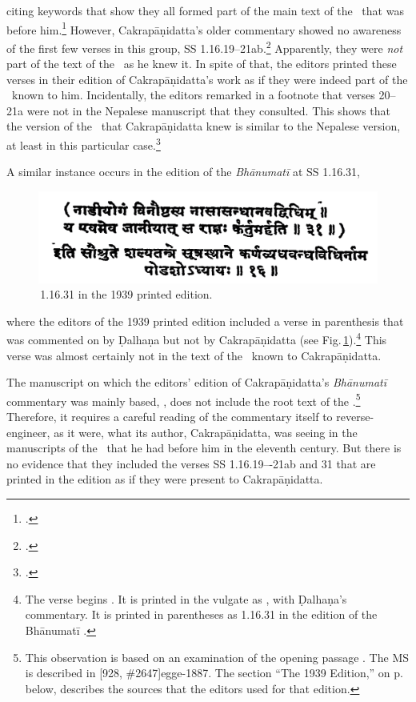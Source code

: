 citing keywords that show they all formed part of the main text of the \SS\ that
was before him.\footnote{.} However, Cakrapāṇidatta's
    older commentary showed no awareness of the first few verses in this group, SS
    1.16.19--21ab.\footcite[130--131]{acar-1939}  Apparently, they were \emph{not}
    part of the text of the \SS\ as he knew it.  In spite of that, the editors printed
    these verses in their edition of Cakrapāṇidatta's work as if they were indeed part
    of the \SS\ known to him. Incidentally, the editors remarked in a footnote that
    verses 20--21a were not in the Nepalese manuscript that they consulted.  This
    shows that the version of the \SS\ that Cakrapāṇidatta knew is similar to the
    Nepalese version, at least in this particular case.\footcite[130, n.\,2]{acar-1939}

A similar instance occurs in the edition of the \emph{Bhānumatī} at SS 1.16.31, 
\begin{figure}[t]
    \centering
    \includegraphics[draft=false,width=.90\linewidth]{media/nadiyogam-upscaled}
    \caption{\SS\,1.16.31 in the 1939 printed edition.}
    \label{fig:nadiyogam}
\end{figure}
where the editors of the 1939 printed edition included a verse in parenthesis that was
commented on by Ḍalhaṇa but not by Cakrapāṇidatta (see 
Fig.\,\ref{fig:nadiyogam}).\footnote{The verse begins 
.  It is printed in the vulgate as 
, with Ḍalhaṇa's commentary.  It is printed in parentheses as 1.16.31 in the 
edition of the Bhānumatī \citep[133]{acar-1939}.} This verse was almost certainly not in the 
text of the \SS\ known to Cakrapāṇidatta. 

The manuscript on which the editors' edition of Cakrapāṇidatta's \emph{Bhānumatī}
commentary was mainly based,  , does not
include the root text of the \SS.\footnote{This observation is based on an
    examination of the opening passage . The MS
    is described in [928, \#2647]{egge-1887}. %
    The section “The 1939 Edition,” on p.\,\pageref{1939edition} below, describes
    the sources that the editors used for that edition.}  Therefore, it requires a
    careful reading of the commentary itself to reverse-engineer, as it were, what
    its author, Cakrapāṇidatta, was seeing in the manuscripts of the \SS\ that he
    had before him in the eleventh century. But there is no evidence that they
    included the verses SS 1.16.19–-21ab and 31 that are printed in the
    \cite{acar-1939} edition as if they were present to Cakrapāṇidatta.

